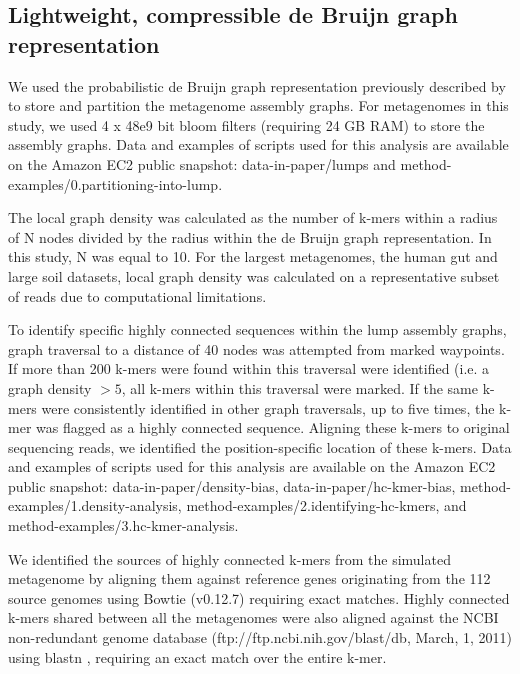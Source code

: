 \documentclass[10pt]{article}
\begin{document}
\subsection*{Lightweight, compressible de Bruijn graph representation}

We used the probabilistic de Bruijn graph representation previously described by \cite{Pell:2012cq}  to store and partition the metagenome assembly
graphs.  For metagenomes in this study, we used 4 x 48e9 bit bloom
filters (requiring 24 GB RAM) to store the assembly graphs.  Data and examples of scripts used for this analysis are
available on the Amazon EC2 public snapshot: data-in-paper/lumps and
method-examples/0.partitioning-into-lump.


The local graph density was calculated as the number of
k-mers within a radius of N nodes divided by the radius within the de Bruijn graph representation.  In this
study, N was equal to 10.  For the largest metagenomes, the human gut
and large soil datasets, local graph density was calculated on a
representative subset of reads due to computational limitations.

To identify specific highly connected sequences within the lump
assembly graphs, graph traversal to a distance of 40 nodes was
attempted from marked waypoints.  If more than 200 k-mers were found
within this traversal were identified (i.e. a graph density $> 5$, all
k-mers within this traversal were marked. If the same k-mers were consistently identified
in other graph traversals, up to five times, the k-mer was flagged as
a highly connected sequence.  Aligning these k-mers to original
sequencing reads, we identified the position-specific location of
these k-mers.  Data and examples of scripts used for this analysis are
available on the Amazon EC2 public snapshot:
data-in-paper/density-bias, data-in-paper/hc-kmer-bias,
method-examples/1.density-analysis,
method-examples/2.identifying-hc-kmers, and
method-examples/3.hc-kmer-analysis.

We identified the sources of highly connected k-mers from the
simulated metagenome by aligning them against reference genes
originating from the 112 source genomes using Bowtie (v0.12.7)
requiring exact matches.  Highly connected k-mers shared between all
the metagenomes were also aligned against the NCBI non-redundant
genome database (ftp://ftp.ncbi.nih.gov/blast/db, March, 1, 2011)
using blastn \cite{Altschul:1990p1335}, requiring an exact match over
the entire k-mer.
\end{document}
